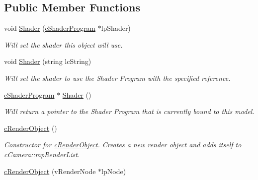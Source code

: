 \subsection*{Public Member Functions}
\begin{DoxyCompactItemize}
\item 
\hypertarget{classc_render_object_abd47a58de22adfe1e9a1970f66a2f4cd}{
void \hyperlink{classc_render_object_abd47a58de22adfe1e9a1970f66a2f4cd}{Shader} (\hyperlink{classc_shader_program}{cShaderProgram} $\ast$lpShader)}
\label{classc_render_object_abd47a58de22adfe1e9a1970f66a2f4cd}

\begin{DoxyCompactList}\small\item\em Will set the shader this object will use. \end{DoxyCompactList}\item 
\hypertarget{classc_render_object_a75f92ce4ba7b36a07e24be0643e4f020}{
void \hyperlink{classc_render_object_a75f92ce4ba7b36a07e24be0643e4f020}{Shader} (string lcString)}
\label{classc_render_object_a75f92ce4ba7b36a07e24be0643e4f020}

\begin{DoxyCompactList}\small\item\em Will set the shader to use the Shader Program with the specified reference. \end{DoxyCompactList}\item 
\hypertarget{classc_render_object_a46f43819b5b1d7a3796e5cb25cf26687}{
\hyperlink{classc_shader_program}{cShaderProgram} $\ast$ \hyperlink{classc_render_object_a46f43819b5b1d7a3796e5cb25cf26687}{Shader} ()}
\label{classc_render_object_a46f43819b5b1d7a3796e5cb25cf26687}

\begin{DoxyCompactList}\small\item\em Will return a pointer to the Shader Program that is currently bound to this model. \end{DoxyCompactList}\item 
\hypertarget{classc_render_object_a4c53fe5d3df67ba2e15001e9c939f94f}{
\hyperlink{classc_render_object_a4c53fe5d3df67ba2e15001e9c939f94f}{cRenderObject} ()}
\label{classc_render_object_a4c53fe5d3df67ba2e15001e9c939f94f}

\begin{DoxyCompactList}\small\item\em Constructor for \hyperlink{classc_render_object}{cRenderObject}. Creates a new render object and adds itself to cCamera::mpRenderList. \end{DoxyCompactList}\item 
\hypertarget{classc_render_object_ac2f9afc83efee8f326bf4f746e59d759}{
\hyperlink{classc_render_object_ac2f9afc83efee8f326bf4f746e59d759}{cRenderObject} (vRenderNode $\ast$lpNode)}
\label{classc_render_object_ac2f9afc83efee8f326bf4f746e59d759}


\end{DoxyCompactItemize}
